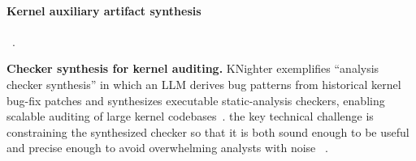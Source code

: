 \paragraph{Kernel auxiliary artifact synthesis}
~.

\textbf{Checker synthesis for kernel auditing.} KNighter exemplifies ``analysis checker synthesis'' in which an LLM derives bug patterns from historical kernel bug-fix patches and synthesizes executable static-analysis checkers, enabling scalable auditing of large kernel codebases~\cite{yang2025knighter}.  the key technical challenge is constraining the synthesized checker so that it is both sound enough to be useful and precise enough to avoid overwhelming analysts with noise ~\cite{yang2025knighter}.


